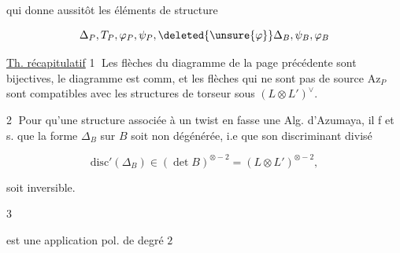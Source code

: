 
qui donne aussitôt les éléments
de structure

\[
\Delta_P,T_P,\varphi_P,\psi_P,\deleted{\unsure{\varphi}}\Delta_B,\psi_B,\varphi_B
\]

\uline{Th. récapitulatif} \textcircled{1} Les flèches
du diagramme de la page précédente
sont bijectives, le diagramme est
comm, et les  flèches qui ne sont
pas de source $\mathrm{Az}_P$ sont compatibles
avec les structures de torseur
sous $(L\otimes L')^\vee$.

\textcircled{2} Pour qu'une structure  associée
à un twist en fasse une Alg.
d'Azumaya, il f et s. que
la forme $\Delta_B$ sur $B$ soit non
dégénérée, i.e que son discriminant
divisé

\[
\mathrm{disc}'(\Delta_B)\in(\det B)^{\otimes-2}=(L\otimes L')^{\otimes-2},
\]

soit inversible.


\textcircled{3}


est une application  pol. de degré $2$

